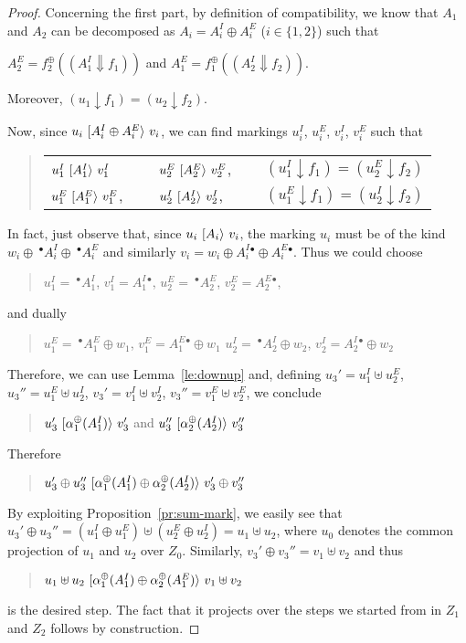 \documentclass{LMCS}
\newcommand{\mjoin}{\ensuremath{\uplus}}
\newcommand{\monSub}[2]{\ensuremath{{#1}_{#2}^\oplus}}
\newcommand{\res}[2]{\ensuremath{({#1}\!\downarrow\!{#2})}}
\newcommand{\sres}[2]{\ensuremath{({#1}\!\Downarrow\!{#2})}}
\newcommand{\pre}[1][(\cdot)]{\ensuremath{\!~^\bullet{#1}}}
\newcommand{\post}[1][(\cdot)]{\ensuremath{{#1} {^\bullet}}}
\newcommand{\trans}[1]{\ensuremath{\ [\/{#1}\/\rangle}\ }
\begin{document}
\begin{proof}
  Concerning the first part, by definition of compatibility, we know
  that $A_1$ and $A_2$ can be decomposed as $A_i = A_i^I \oplus A_i^E$
  ($i \in \{1,2\}$) such that
  \begin{center}
    $A_2^E = \monSub{f}{2}(\sres{A_1^I}{f_1})$ \quad and \quad
    $A_1^E = \monSub{f}{1}(\sres{A_2^I}{f_2})$.
  \end{center}
  Moreover, $\res{u_1}{f_1} = \res{u_2}{f_2}$.

  Now, since $u_i \trans{A_i^I \oplus A_i^E} v_i$, we can find markings 
  $u_i^I$, $u_i^E$, $v_i^I$, $v_i^E$ such that
  \begin{quote}
    \begin{tabular}{lll}
      $u_1^I \trans{A_1^I} v_1^I$ \ \ \ \ &  $u_2^E \trans{A_2^E} v_2^E$, \ \ & $\res{u_1^I}{f_1} = \res{u_2^E}{f_2}$\\
    $u_1^E \trans{A_1^E} v_1^E$, & $u_2^I \trans{A_2^I} v_2^I$, & $\res{u_1^E}{f_1} = \res{u_2^I}{f_2}$
  \end{tabular}
\end{quote}
  In fact, just observe that, since $u_i \trans{A_i} v_i$, the marking $u_i$
  must be of the kind $w_i \oplus \pre[A_i^I] \oplus \pre[A_i^E]$ and 
  similarly $v_i = w_i \oplus \post[A_i^I] \oplus \post[A_i^E]$.
Thus
  we could choose 
  \begin{quote}
    $u_1^I = \pre[A_1^I]$, \quad $v_1^I = \post[A_1^I]$,  \quad
    $u_2^E = \pre[A_2^E]$, \quad $v_2^E = \post[A_2^E]$,
  \end{quote}
  and dually
  \begin{quote}
    $u_1^E= \pre[A_1^E] \oplus w_1$, \quad $v_1^E = \post[A_1^E] \oplus w_1$ \quad
    $u_2^I = \pre[A_2^I] \oplus w_2$, \quad $v_2^I = \post[A_2^I] \oplus w_2$
  \end{quote}
  Therefore, we can use Lemma~\ref{le:downup} and, defining
  $u_3' = u_1^I \mjoin u_2^E$, $u_3'' = u_1^E \mjoin u_2^I$,
  $v_3' = v_1^I \mjoin v_2^I$, $v_3'' = v_1^E \mjoin v_2^E$,
  we conclude
  \begin{quote}
    $u_3' \trans{\monSub{\alpha}{1}(A_1^I)} v_3'$ and 
    $u_3'' \trans{\monSub{\alpha}{2}(A_2^I)} v_3''$ 
  \end{quote}
  Therefore
  \begin{quote}
    $u_3' \oplus u_3'' \trans{\monSub{\alpha}{1}(A_1^I) \oplus
    \monSub{\alpha}{2}(A_2^I)} v_3' \oplus v_3''$
  \end{quote}

  By exploiting Proposition~\ref{pr:sum-mark}, we easily see that
  $u_3' \oplus u_3'' = (u_1^I \oplus u_1^E) \mjoin (u_2^E \oplus u_2^I) = u_1 \mjoin u_2$, where $u_0$ denotes
  the common projection of $u_1$ and $u_2$ over $Z_0$. Similarly,
  $v_3' \oplus v_3'' = v_1 \mjoin v_2$ and thus
  \begin{quote}
    $u_1 \mjoin u_2
    \trans{\monSub{\alpha}{1}(A_1^I) \oplus \monSub{\alpha}{2}(A_1^E)}
    v_1 \mjoin v_2$
  \end{quote}
  is the desired step. The fact that it projects over the steps we started
  from in $Z_1$ and $Z_2$ follows by construction.


\end{proof}
\end{document}
